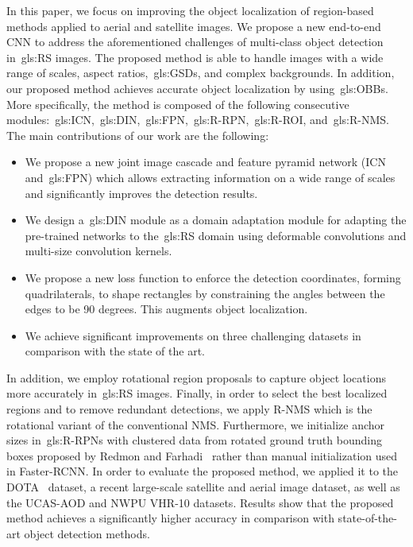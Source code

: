 \documentclass[runningheads]{llncs}
\begin{document}
	In this paper, we focus on improving the object localization of region-based methods applied to aerial and satellite images.
    We propose a new end-to-end CNN to address the aforementioned challenges of multi-class object detection in~\gls{gls:RS} images. The proposed method is able to handle images with a wide range of scales, aspect ratios,~\glspl{gls:GSD}, and complex backgrounds. In addition, our proposed method achieves accurate object localization by using~\glspl{gls:OBB}. 
   More specifically, the method is composed of the following consecutive modules:~\gls{gls:ICN},~\gls{gls:DIN},~\gls{gls:FPN},~\gls{gls:R-RPN},~\gls{gls:R-ROI}, and~\gls{gls:R-NMS}.
The main contributions of our work are the following:
\begin{itemize}
  \item We propose a new joint image cascade and feature pyramid network (ICN and~\gls{gls:FPN}) which allows extracting information on a wide range of scales and significantly improves the detection results. 
  \item We design a~\gls{gls:DIN} module as a domain adaptation module for adapting the pre-trained networks to the~\gls{gls:RS} domain using deformable convolutions and multi-size convolution kernels.
  \item We propose a new loss function to enforce the detection coordinates, forming quadrilaterals, to shape rectangles by constraining the angles between the edges to be 90 degrees. This augments object localization.
  \item We achieve significant improvements on three challenging datasets in comparison with the state of the art.
\end{itemize}
In addition, we employ rotational region proposals to capture object locations more accurately in~\gls{gls:RS} images.
Finally, in order to select the best localized regions and to remove redundant detections, we apply R-NMS which is the rotational variant of the conventional NMS.
Furthermore, we initialize anchor sizes in~\glspl{gls:R-RPN} with clustered data from rotated ground truth bounding boxes proposed by Redmon and Farhadi~\cite{redmon2017yolo9000} rather than manual initialization used in Faster-RCNN.
In order to evaluate the proposed method, we applied it to the DOTA~\cite{dota} dataset, a recent large-scale satellite and aerial image dataset, as well as the UCAS-AOD and NWPU VHR-10 datasets.
Results show that the proposed method achieves a significantly higher accuracy in comparison with state-of-the-art object detection methods.
\end{document}
